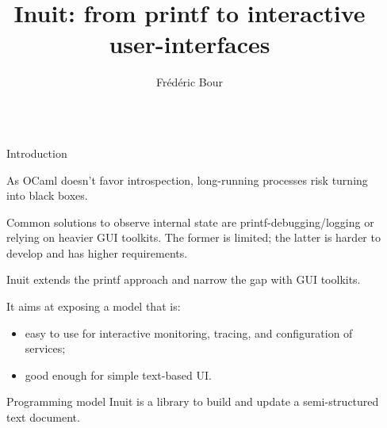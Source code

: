 \documentclass[final]{beamer}
\title{Inuit: from printf to interactive user-interfaces} %
\author{Fr\'ed\'eric Bour} %
\institute{OCL, University of Cambridge} %
\newlength{\sepwid}
\newlength{\onecolwid}
\begin{document}

\setlength{\belowcaptionskip}{2ex} %
\setlength\belowdisplayshortskip{2ex} %

\begin{frame}[containsverbatim,t] %

\begin{columns}[t] %

\begin{column}{\sepwid}\end{column} %

\begin{column}{\onecolwid} %


\begin{block}{Introduction}

  As OCaml doesn't favor introspection, long-running processes risk turning into
  black boxes.

  Common solutions to observe internal state are printf-debugging/logging or
  relying on heavier GUI toolkits. The former is limited; the latter is harder
  to develop and has higher requirements.

  Inuit extends the printf approach and narrow the gap with GUI toolkits.

  It aims at exposing a model that is:

  \begin{itemize}
  \item easy to use for interactive monitoring, tracing, and configuration of
    services;
  \item good enough for simple text-based UI.
  \end{itemize}

\end{block}

\begin{alertblock}{Programming model}
  Inuit is a library to build and update a semi-structured text document.


\end{alertblock}
\end{column}
\end{columns}
\end{frame}
\end{document}

